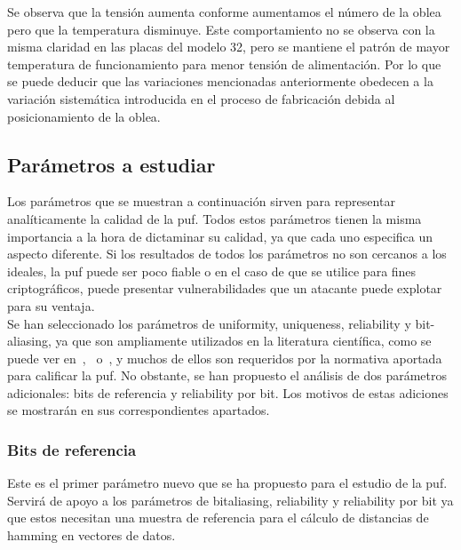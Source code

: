 \documentclass[spanish]{template/minim}
\begin{document}
Se observa que la tensión aumenta conforme aumentamos el número de la oblea pero que la temperatura disminuye. Este comportamiento no se observa con la misma claridad en las placas del modelo 32, pero se mantiene el patrón de mayor temperatura de funcionamiento para menor tensión de alimentación. Por lo que se puede deducir que las variaciones mencionadas anteriormente obedecen a la variación sistemática introducida en el proceso de fabricación debida al posicionamiento de la oblea.\\



\subsection{Parámetros a estudiar}

Los parámetros que se muestran a continuación sirven para representar analíticamente la calidad de la \gls{puf}. Todos estos parámetros tienen la misma importancia a la hora de dictaminar su calidad, ya que cada uno especifica un aspecto diferente. Si los resultados de todos los parámetros no son cercanos a los ideales, la \gls{puf} puede ser poco fiable o en el caso de que se utilice para fines criptográficos, puede presentar vulnerabilidades que un atacante puede explotar para su ventaja.\\

Se han seleccionado los parámetros de uniformity, uniqueness, reliability y bit-aliasing, ya que son ampliamente utilizados en la literatura científica, como se puede ver en~\cite{90nm},~\cite{sram_xmc} o~\cite{maiti_evaluation}, y muchos de ellos son requeridos por la normativa aportada para calificar la \gls{puf}. No obstante, se han propuesto el análisis de dos parámetros adicionales: bits de referencia y reliability por bit. Los motivos de estas adiciones se mostrarán en sus correspondientes apartados.\\




\subsubsection{Bits de referencia}\label{sec:ref_bits}

Este es el primer parámetro nuevo que se ha propuesto para el estudio de la \gls{puf}. Servirá de apoyo a los parámetros de bitaliasing, reliability y reliability por bit ya que estos necesitan una muestra de referencia para el cálculo de distancias de hamming en vectores de datos.\\
\end{document}
